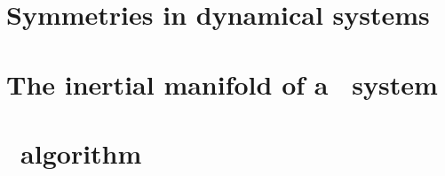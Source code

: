 






\chapter{Symmetries in dynamical systems}
\label{chap:Symmetry}




%

\chapter{\KSe}
\label{chap:ks}








\chapter{The inertial manifold of a \KS\ system}
\label{chap:im}






% 

% 

\chapter{\Ped\ algorithm}
\label{chap:ped}

